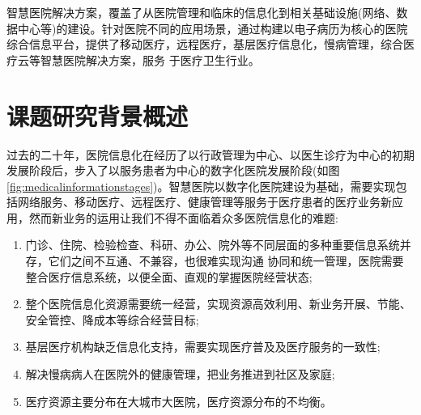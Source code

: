\documentclass[doctor,secret]{thuthesis}
\begin{document}
智慧医院解决方案，覆盖了从医院管理和临床的信息化到相关基础设施(网络、数据中心等)的建设。针对医院不同的应用场景，通过构建以电子病历为核心的医院综合信息平台，提供了移动医疗，远程医疗，基层医疗信息化，慢病管理，综合医疗云等智慧医院解决方案，服务 于医疗卫生行业。

\section{课题研究背景概述}
\label{sec:org82b139f}
过去的二十年，医院信息化在经历了以行政管理为中心、以医生诊疗为中心的初期发展阶段后，步入了以服务患者为中心的数字化医院发展阶段(如图\ref{fig:medicalinformationstages})。智慧医院以数字化医院建设为基础，需要实现包括网络服务、移动医疗、远程医疗、健康管理等服务于医疗患者的医疗业务新应用，然而新业务的运用让我们不得不面临着众多医院信息化的难题:
\begin{enumerate}
\item 门诊、住院、检验检查、科研、办公、院外等不同层面的多种重要信息系统并存，它们之间不互通、不兼容，也很难实现沟通 协同和统一管理，医院需要整合医疗信息系统，以便全面、直观的掌握医院经营状态;
\item 整个医院信息化资源需要统一经营，实现资源高效利用、新业务开展、节能、安全管控、降成本等综合经营目标;
\item 基层医疗机构缺乏信息化支持，需要实现医疗普及及医疗服务的一致性;
\item 解决慢病病人在医院外的健康管理，把业务推进到社区及家庭;
\item 医疗资源主要分布在大城市大医院，医疗资源分布的不均衡。
\end{enumerate}
\end{document}

